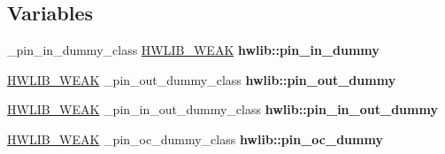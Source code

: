 \subsection*{Variables}
\begin{DoxyCompactItemize}
\item 
\+\_\+pin\+\_\+in\+\_\+dummy\+\_\+class \hyperlink{hwlib-defines_8hpp_a04be4340016df60d6636c1d1c6d94fc9}{H\+W\+L\+I\+B\+\_\+\+W\+E\+AK} {\bfseries hwlib\+::pin\+\_\+in\+\_\+dummy}\hypertarget{namespacehwlib_af4a61043143177f6af8e0284e4524433}{}\label{namespacehwlib_af4a61043143177f6af8e0284e4524433}

\item 
\hyperlink{hwlib-defines_8hpp_a04be4340016df60d6636c1d1c6d94fc9}{H\+W\+L\+I\+B\+\_\+\+W\+E\+AK} \+\_\+pin\+\_\+out\+\_\+dummy\+\_\+class {\bfseries hwlib\+::pin\+\_\+out\+\_\+dummy}\hypertarget{namespacehwlib_acaf0b10a2f1c9765e1b91a98453adb20}{}\label{namespacehwlib_acaf0b10a2f1c9765e1b91a98453adb20}

\item 
\hyperlink{hwlib-defines_8hpp_a04be4340016df60d6636c1d1c6d94fc9}{H\+W\+L\+I\+B\+\_\+\+W\+E\+AK} \+\_\+pin\+\_\+in\+\_\+out\+\_\+dummy\+\_\+class {\bfseries hwlib\+::pin\+\_\+in\+\_\+out\+\_\+dummy}\hypertarget{namespacehwlib_a166a4bea8640903b2141ede3e703eb60}{}\label{namespacehwlib_a166a4bea8640903b2141ede3e703eb60}

\item 
\hyperlink{hwlib-defines_8hpp_a04be4340016df60d6636c1d1c6d94fc9}{H\+W\+L\+I\+B\+\_\+\+W\+E\+AK} \+\_\+pin\+\_\+oc\+\_\+dummy\+\_\+class {\bfseries hwlib\+::pin\+\_\+oc\+\_\+dummy}\hypertarget{namespacehwlib_a297be6e8b97db1f338641a5d2864e741}{}\label{namespacehwlib_a297be6e8b97db1f338641a5d2864e741}

\end{DoxyCompactItemize}
